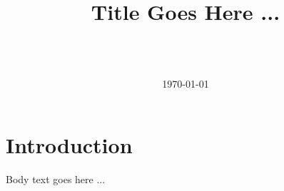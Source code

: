 \documentclass{myarticle}
\title{\huge{\textbf{Title Goes Here ...}}}
\author{\name \\ \affiliation \\ \email}
\date{\today}
\begin{document}
\maketitle

\section{Introduction}
Body text goes here ...

\lipsum[1-3]

\end{document}

